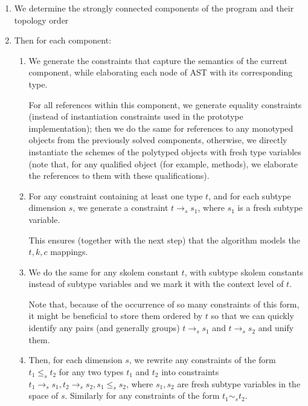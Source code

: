 \begin{enumerate}
    \item We determine the strongly connected components of the program and their topology order 

    \item Then for each component:

    \begin{enumerate}
        \item We generate the constraints that capture the semantics of the current component, while elaborating each node of AST with its corresponding type.

        For all references within this component, we generate equality constraints (instead of instantiation constraints used in the prototype implementation); then we do the same for references to any monotyped objects from the previously solved components, otherwise, we directly instantiate the schemes of the polytyped objects with fresh type variables (note that, for any qualified object (for example, methods), we elaborate the references to them with these qualifications).

        \item For any constraint containing at least one type $t$, and for each subtype dimension $s$, we generate a constraint $t \to_s s_1$, where $s_1$ is a fresh subtype variable.

        This ensures (together with the next step) that the algorithm models the $t, k, c$ mappings.

        \item We do the same for any skolem constant $t$, with subtype skolem constants instead of subtype variables and we mark it with the context level of $t$. \label{gen_subskolem}

        Note that, because of the occurrence of so many constraints of this form, it might be beneficial to store them ordered by $t$ so that we can quickly identify any pairs (and generally groups) $t \to_s s_1$ and $t \to_s s_2$ and unify them. \label{mapping_once}


        \item Then, for each dimension $s$, we rewrite any constraints of the form $t_1 \leq_s t_2$ for any two types $t_1$ and $t_2$ into constraints $t_1 \to_s s_1, t_2 \to_s s_2, s_1 \leq_s s_2$, where $s_1, s_2$ are fresh subtype variables in the space of $s$. Similarly for any constraints of the form $t_1 \sim_s t_2$.


\end{enumerate}
\end{enumerate}
